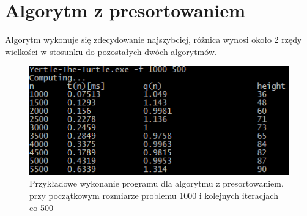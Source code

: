 \documentclass[11pt,a4paper]{article}
\begin{document}
\section{Algorytm z presortowaniem}
Algorytm wykonuje się zdecydowanie najszybciej, różnica wynosi około 2 rzędy wielkości w stosunku do pozostałych dwóch algorytmów.
\begin{figure}[h]
  \centering
  \includegraphics[scale=1.25]{yertleF.png}
  \caption{Przykładowe wykonanie programu dla algorytmu z presortowaniem, przy początkowym rozmiarze problemu 1000 i kolejnych iteracjach co 500 }
  \label{fig:yertleF}
\end{figure}
\end{document}
